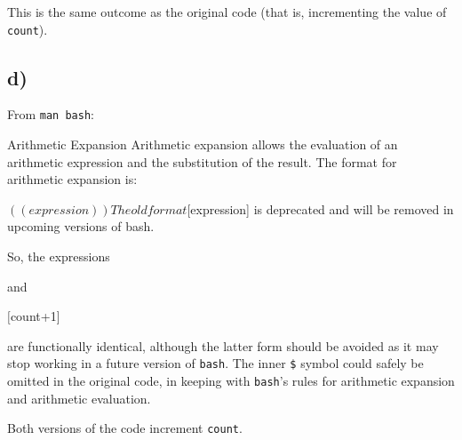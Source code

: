\documentclass{article}
\begin{document}
This is the same outcome as the original code (that is, incrementing the value of \texttt{count}).

\subsection{d)}

From \texttt{man bash}:

\begin{bashinline}
Arithmetic Expansion
    Arithmetic expansion allows the evaluation of an arithmetic expression and the substitution of the result.  The format for arithmetic expansion is:

        $((expression))

    The old format $[expression] is deprecated and will be removed in upcoming versions of bash.
\end{bashinline}

So, the expressions


and

\begin{bashcode}
$[$count+1]
\end{bashcode}

are functionally identical, although the latter form should be avoided as it may stop working in a future version of \texttt{bash}. The inner \texttt{\$} symbol could safely be omitted in the original code, in keeping with \texttt{bash}'s rules for arithmetic expansion and arithmetic evaluation.

Both versions of the code increment \texttt{count}.
\end{document}
